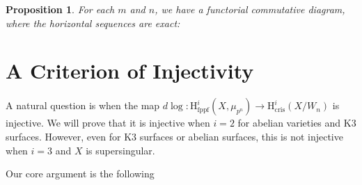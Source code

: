 \documentclass[a4paper,12pt,twoside]{report}
\newtheorem{proposition}[theorem]{Proposition}
\newcommand{\cris}{\mathrm{cris}}
\newcommand{\fppf}{\mathrm{fppf}}
\newcommand{\HH}{\mathrm{H}}
\begin{document}
\begin{proposition}\label{LES}
    For each $m$ and $n$, we have a functorial commutative diagram, where the horizontal sequences are exact: 
    \begin{small}
    \begin{center}\label{LESD}
    \end{center}
    \end{small}

\end{proposition}

\section{A Criterion of Injectivity}

A natural question is when the map 
$d\log\colon \HH^i_{\fppf}(X,\mu_{p^n})\to \HH^i_{\cris}(X/W_n)$ is injective.
We will prove that it is injective when $i=2$ for abelian varieties and K3 surfaces.
However, even for K3 surfaces or abelian surfaces, this is not injective when $i=3$ and
$X$ is supersingular.

Our core argument is the following
\end{document}
